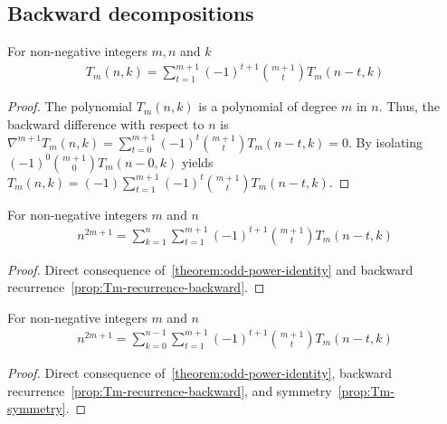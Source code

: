 \subsection{Backward decompositions}\label{subsec:backward-decompositions}
\begin{proposition}
    \label{prop:Tm-recurrence-backward}
    For non-negative integers $m,n$ and $k$
    \begin{align*}
        T_{m} (n, k) = \sum_{t=1}^{m+1} (-1)^{t+1} \binom{m+1}{t} T_{m} (n-t, k)
    \end{align*}
    \begin{proof}
        The polynomial $T_{m} (n,k)$ is a polynomial of degree $m$ in $n$.
        Thus, the backward difference with respect to $n$ is
        $\nabla^{m+1} T_{m} (n, k) = \sum_{t=0}^{m+1} (-1)^{t} \binom{m+1}{t} T_{m} (n-t, k) = 0$.
        By isolating $(-1)^{0} \binom{m+1}{0} T_{m} (n-0, k)$ yields
        $T_{m} (n, k) = (-1) \sum_{t=1}^{m+1} (-1)^{t} \binom{m+1}{t} T_{m} (n-t, k)$.
    \end{proof}
\end{proposition}

\begin{proposition}
    \label{prop:odd-power-decomposition-backward}
    For non-negative integers $m$ and $n$
    \begin{align*}
        n^{2m+1} = \sum_{k=1}^{n} \sum_{t=1}^{m+1} (-1)^{t+1} \binom{m+1}{t} T_{m} (n-t, k)
    \end{align*}
    \begin{proof}
        Direct consequence of~\eqref{theorem:odd-power-identity}
        and backward recurrence~\eqref{prop:Tm-recurrence-backward}.
    \end{proof}
\end{proposition}

\begin{proposition}
    \label{prop:odd-power-decomposition-backward-shifted}
    For non-negative integers $m$ and $n$
    \begin{align*}
        n^{2m+1} = \sum_{k=0}^{n-1} \sum_{t=1}^{m+1} (-1)^{t+1} \binom{m+1}{t} T_{m} (n-t, k)
    \end{align*}
    \begin{proof}
        Direct consequence of~\eqref{theorem:odd-power-identity},
        backward recurrence~\eqref{prop:Tm-recurrence-backward}, and symmetry~\eqref{prop:Tm-symmetry}.
    \end{proof}
\end{proposition}

